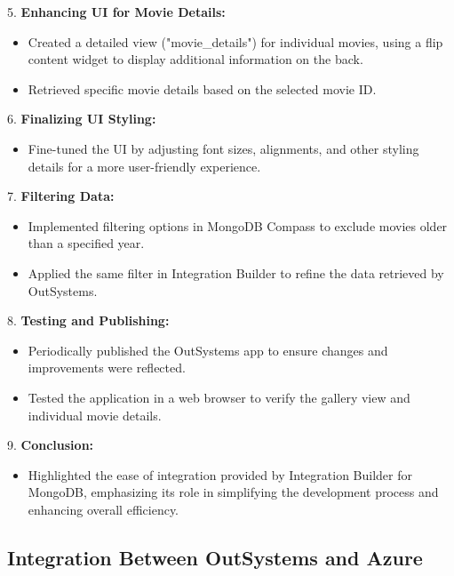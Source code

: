    5. \textbf{Enhancing UI for Movie Details:}
      \begin{itemize}
         \item Created a detailed view ("movie\_details") for individual movies, using a flip content widget to display additional information on the back.
         \item Retrieved specific movie details based on the selected movie ID.
      \end{itemize}

   6. \textbf{Finalizing UI Styling:}
      \begin{itemize}
         \item Fine-tuned the UI by adjusting font sizes, alignments, and other styling details for a more user-friendly experience.
      \end{itemize}

   7. \textbf{Filtering Data:}
      \begin{itemize}
         \item Implemented filtering options in MongoDB Compass to exclude movies older than a specified year.
         \item Applied the same filter in Integration Builder to refine the data retrieved by OutSystems.
      \end{itemize}

   8. \textbf{Testing and Publishing:}
      \begin{itemize}
         \item Periodically published the OutSystems app to ensure changes and improvements were reflected.
         \item Tested the application in a web browser to verify the gallery view and individual movie details.
      \end{itemize}

   9. \textbf{Conclusion:}
      \begin{itemize}
         \item Highlighted the ease of integration provided by Integration Builder for MongoDB, emphasizing its role in simplifying the development process and enhancing overall efficiency.
      \end{itemize}

   \subsection{Integration Between OutSystems and Azure}\label{subsec:outsystems-azure}

